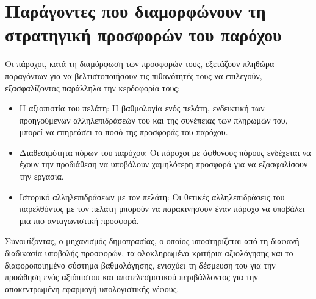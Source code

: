\section{Παράγοντες που διαμορφώνουν τη στρατηγική προσφορών του παρόχου}
Οι πάροχοι, κατά τη διαμόρφωση των προσφορών τους, εξετάζουν πληθώρα παραγόντων για να βελτιστοποιήσουν τις πιθανότητές τους να επιλεγούν, εξασφαλίζοντας παράλληλα την κερδοφορία τους:
\begin{itemize}
    \item Η αξιοπιστία του πελάτη: Η βαθμολογία ενός πελάτη, ενδεικτική των προηγούμενων αλληλεπιδράσεών του και της συνέπειας των πληρωμών του, μπορεί να επηρεάσει το ποσό της προσφοράς του παρόχου.
    \item Διαθεσιμότητα πόρων του παρόχου: Οι πάροχοι με άφθονους πόρους ενδέχεται να έχουν την προδιάθεση να υποβάλουν χαμηλότερη προσφορά για να εξασφαλίσουν την εργασία.
    \item Ιστορικό αλληλεπιδράσεων με τον πελάτη: Οι θετικές αλληλεπιδράσεις του παρελθόντος με τον πελάτη μπορούν να παρακινήσουν έναν πάροχο να υποβάλει μια πιο ανταγωνιστική προσφορά.
\end{itemize}

Συνοψίζοντας, ο μηχανισμός δημοπρασίας, ο οποίος υποστηρίζεται από τη διαφανή διαδικασία υποβολής προσφορών, τα ολοκληρωμένα κριτήρια αξιολόγησης και το διαφοροποιημένο σύστημα βαθμολόγησης, ενισχύει τη δέσμευση του  για την προώθηση ενός αξιόπιστου και αποτελεσματικού περιβάλλοντος για την αποκεντρωμένη εφαρμογή υπολογιστικής νέφους.
